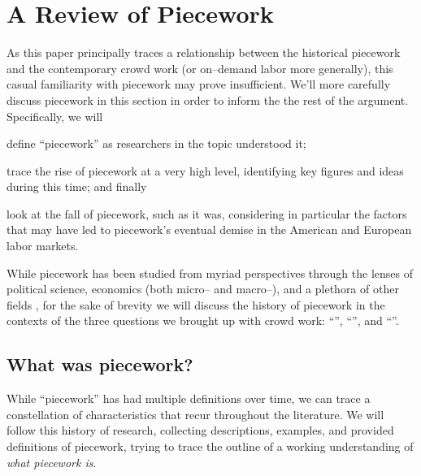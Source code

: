 \documentclass[trackingWork]{subfiles}
\begin{document}
\section{A Review of Piecework}

As this paper principally traces a relationship between
the historical piecework and the contemporary crowd work
(or on--demand labor more generally),
this casual familiarity with piecework may prove insufficient.
We'll more carefully discuss piecework in this section in order
to inform the the rest of the argument.
Specifically, we will
\begin{inlinelist}
  \item define ``piecework'' as researchers in the topic understood it;
  \item trace the rise of piecework at a very high level,
        identifying key figures and ideas during this time; and finally
  \item look at the fall of piecework, such as it was,
        considering in particular
        the factors that may have led to piecework's
        eventual demise in the American and European labor markets.
\end{inlinelist}

While piecework has been studied from myriad perspectives through the lenses of
political science,
economics (both micro-- and macro--), and
a plethora of other fields
, for the sake of brevity
we will discuss the history of piecework in the contexts of the three questions we brought up with crowd work:
``'',
``'', and 
``''.


\subsection{What was piecework?}
While ``piecework'' has had multiple definitions over time,
we can trace a constellation of characteristics that recur throughout the literature.
We will follow this history of research, collecting
descriptions,
examples, and
provided definitions of piecework, trying
to trace the outline of a working understanding of
\textit{what piecework is}.
\end{document}
